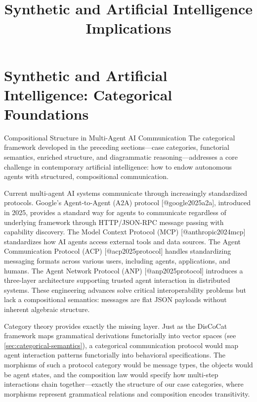\documentclass[
  ignorenonframetext,
]{beamer}
\title{\texorpdfstring{Synthetic and Artificial Intelligence
Implications}{Synthetic and Artificial Intelligence Implications}}
\author{\texorpdfstring{}{}}
\date{}
\begin{document}
\frame{\titlepage}

\section{Synthetic and Artificial Intelligence: Categorical
Foundations}\label{sec:ai-implications}

\begin{frame}{Compositional Structure in Multi-Agent AI Communication}
\protect{}\label{compositional-structure-in-multi-agent-ai-communication}
The categorical framework developed in the preceding sections---case
categories, functorial semantics, enriched structure, and diagrammatic
reasoning---addresses a core challenge in contemporary artificial
intelligence: how to endow autonomous agents with structured,
compositional communication.

Current multi-agent AI systems communicate through increasingly
standardized protocols. Google's Agent-to-Agent (A2A) protocol
{[}@google2025a2a{]}, introduced in 2025, provides a standard way for
agents to communicate regardless of underlying framework through
HTTP/JSON-RPC message passing with capability discovery. The Model
Context Protocol (MCP) {[}@anthropic2024mcp{]} standardizes how AI
agents access external tools and data sources. The Agent Communication
Protocol (ACP) {[}@acp2025protocol{]} handles standardizing messaging
formats across various users, including agents, applications, and
humans. The Agent Network Protocol (ANP) {[}@anp2025protocol{]}
introduces a three-layer architecture supporting trusted agent
interaction in distributed systems. These engineering advances solve
critical interoperability problems but lack a compositional semantics:
messages are flat JSON payloads without inherent algebraic structure.

Category theory provides exactly the missing layer. Just as the DisCoCat
framework maps grammatical derivations functorially into vector spaces
(see \autoref{sec:categorical-semantics}), a categorical communication
protocol would map agent interaction patterns functorially into
behavioral specifications. The morphisms of such a protocol category
would be message types, the objects would be agent states, and the
composition law would specify how multi-step interactions chain
together---exactly the structure of our case categories, where morphisms
represent grammatical relations and composition encodes transitivity.
\end{frame}
\end{document}
